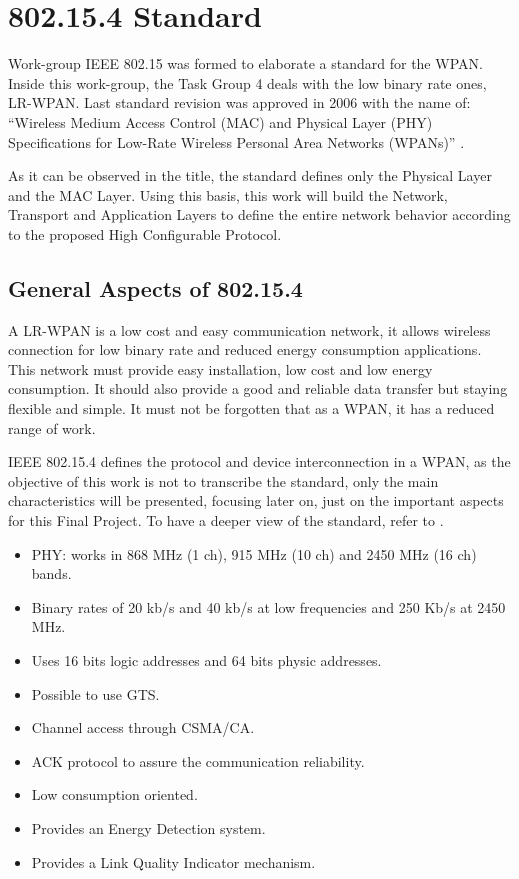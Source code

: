 \chapter{802.15.4 Standard}
\label{chap:802154standard}

Work-group \ac{IEEE} 802.15 was formed to elaborate a standard for the \ac{WPAN}. Inside this work-group, the Task Group 4 
deals with the low binary rate ones, \ac{LR-WPAN}. Last standard revision was approved in 2006 with the name of: ``Wireless 
Medium Access Control (\ac{MAC}) and Physical Layer (\ac{PHY}) Specifications for Low-Rate Wireless Personal Area Networks (\acp{WPAN})'' 
\cite{IEEE802.15.4-2006}.

As it can be observed in the title, the standard defines only the Physical Layer and the \ac{MAC} Layer. Using this basis, 
this work will build the Network, Transport and Application Layers to define the entire network behavior according to the proposed 
High Configurable Protocol.

\section{General Aspects of 802.15.4}

A \ac{LR-WPAN} is a low cost and easy communication network, it allows wireless connection for low binary rate and reduced 
energy consumption applications. This network must provide easy installation, low cost and low energy consumption. It should
also provide a good and reliable data transfer but staying flexible and simple. It must not be forgotten that as a \ac{WPAN}, it
has a reduced range of work.

\ac{IEEE} 802.15.4 defines the protocol and device interconnection in a \ac{WPAN}, as the objective of this work is not to 
transcribe the standard, only the main characteristics will be presented, focusing later on, just on the important aspects
for this Final Project. To have a deeper view of the standard, refer to \cite{IEEE802.15.4-2006}.

\begin{itemize}
 \item \ac{PHY}: works in 868 MHz (1 ch), 915 MHz (10 ch) and 2450 MHz (16 ch) bands.
 \item Binary rates of 20 kb/s and 40 kb/s at low frequencies and 250 Kb/s at 2450 MHz.
 \item Uses 16 bits logic addresses and 64 bits physic addresses.
 \item Possible to use \ac{GTS}.
 \item Channel access through \ac{CSMA/CA}.
 \item \ac{ACK} protocol to assure the communication reliability.
 \item Low consumption oriented.
 \item Provides an Energy Detection system.
 \item Provides a Link Quality Indicator mechanism.
\end{itemize}

